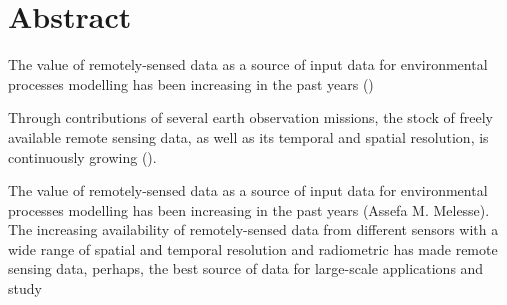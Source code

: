 \chapter{Abstract}


The value of remotely-sensed data as a source of input data for environmental processes modelling has been increasing in the past years (\cite{melesse2007remote})

Through contributions of several earth observation missions, the stock of freely available remote sensing data, as well as its temporal and spatial resolution, is continuously growing (\cite{melesse2007remote}).


The value of remotely-sensed data as a source of input data for environmental processes modelling has been increasing in the past years (Assefa M. Melesse). The increasing availability of remotely-sensed data from different sensors with a wide range of spatial and temporal resolution and radiometric has made remote sensing data, perhaps, the best source of data for large-scale applications and study 